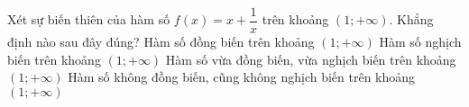 \begin{ex}%
	Xét sự biến thiên của hàm số $f(x)=x+\dfrac{1}{x}$ trên khoảng $\left(1;+\infty \right)$. Khẳng định nào sau đây đúng?
	\choice
	{\True Hàm số đồng biến trên khoảng $\left(1;+\infty \right)$}
	{Hàm số nghịch biến trên khoảng $\left(1;+\infty \right)$}
	{Hàm số vừa đồng biến, vừa nghịch biến trên khoảng $\left(1;+\infty \right)$}
	{Hàm số không đồng biến, cũng không nghịch biến trên khoảng $\left(1;+\infty \right)$}
\end{ex}
